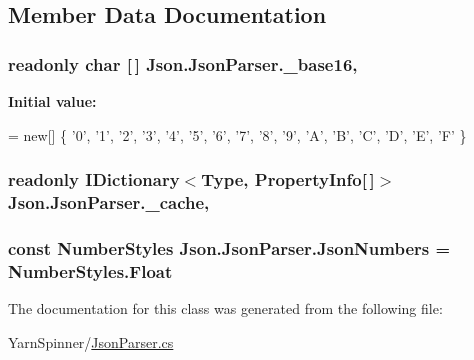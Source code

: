 \subsection{Member Data Documentation}
\hypertarget{a00060_a9d97f297996ac634f58dd842ebc00171}{
\subsubsection[{\-\_\-base16}]{\setlength{\rightskip}{0pt plus 5cm}readonly char \mbox{[}$\,$\mbox{]} Json.\-Json\-Parser.\-\_\-base16\hspace{0.3cm}{\ttfamily [static]}, {\ttfamily [private]}}}\label{a00060_a9d97f297996ac634f58dd842ebc00171}
{\bfseries Initial value\-:}
\begin{DoxyCode}
= \textcolor{keyword}{new}[]
                             \{
                                 \textcolor{charliteral}{'0'}, \textcolor{charliteral}{'1'}, \textcolor{charliteral}{'2'}, \textcolor{charliteral}{'3'}, 
                                 \textcolor{charliteral}{'4'}, \textcolor{charliteral}{'5'}, \textcolor{charliteral}{'6'}, \textcolor{charliteral}{'7'}, 
                                 \textcolor{charliteral}{'8'}, \textcolor{charliteral}{'9'}, \textcolor{charliteral}{'A'}, \textcolor{charliteral}{'B'}, 
                                 \textcolor{charliteral}{'C'}, \textcolor{charliteral}{'D'}, \textcolor{charliteral}{'E'}, \textcolor{charliteral}{'F'}
                             \}
\end{DoxyCode}
\hypertarget{a00060_ae6f928a5caa81742eb3bac3e986f92f6}{
\subsubsection[{\-\_\-cache}]{\setlength{\rightskip}{0pt plus 5cm}readonly I\-Dictionary$<$Type, Property\-Info\mbox{[}$\,$\mbox{]}$>$ Json.\-Json\-Parser.\-\_\-cache\hspace{0.3cm}{\ttfamily [static]}, {\ttfamily [private]}}}\label{a00060_ae6f928a5caa81742eb3bac3e986f92f6}
\hypertarget{a00060_ad05db33540abe9864b13b6b5c637a354}{
\subsubsection[{Json\-Numbers}]{\setlength{\rightskip}{0pt plus 5cm}const Number\-Styles Json.\-Json\-Parser.\-Json\-Numbers = Number\-Styles.\-Float\hspace{0.3cm}{\ttfamily [private]}}}\label{a00060_ad05db33540abe9864b13b6b5c637a354}


The documentation for this class was generated from the following file\-:\begin{DoxyCompactItemize}
\item 
Yarn\-Spinner/\hyperlink{a00139}{Json\-Parser.\-cs}\end{DoxyCompactItemize}
